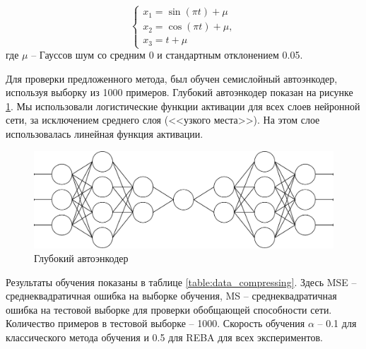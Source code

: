 \begin{equation*}
	\begin{cases}
		x_1=\sin(\pi t) + \mu\\
		x_2=\cos(\pi t) + \mu,\\
		x_3=t + \mu
	\end{cases}
\end{equation*}
где $\mu$ -- Гауссов шум со средним 0 и стандартным отклонением 0.05.

Для проверки предложенного метода, был обучен семислойный автоэнкодер, используя выборку из 1000 примеров. Глубокий автоэнкодер показан на рисунке \ref{fig:autoencoder}. Мы использовали логистические функции активации для всех слоев нейронной сети, за исключением среднего слоя (<<узкого места>>). На этом слое использовалась линейная функция активации.

\begin{figure}[ht]
	\centering
	\includegraphics[width=16cm]{man-source/images/ch3/pic3-5.pdf}
	\caption{Глубокий автоэнкодер}
	\label{fig:autoencoder}
\end{figure}

Результаты обучения показаны в таблице \ref{table:data_compressing}. Здесь MSE -- среднеквадратичная ошибка на выборке обучения, MS -- среднеквадратичная ошибка на тестовой выборке для проверки обобщающей способности сети. Количество примеров в тестовой выборке -- 1000. Скорость обучения $\alpha$ -- 0.1 для классического метода обучения и 0.5 для REBA для всех экспериментов.

